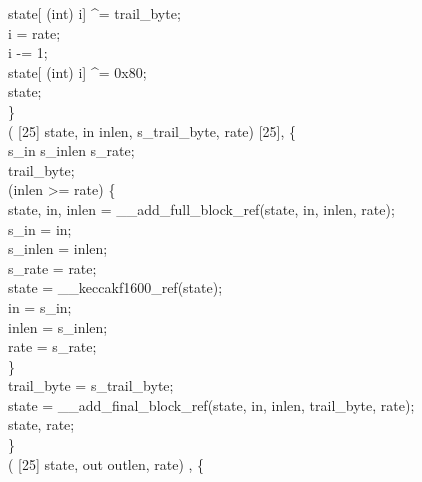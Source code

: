 state[ (int) i] \textasciicircum{}= trail_byte;\\
i = rate;\\
i -= 1;\\
state[ (int) i] \textasciicircum{}= 0x80;\\
 state;\\
\}\\
  ( [25] state,   in inlen,   s_trail_byte,   rate) \jasminarrow{}  [25],   \{\\
  s_in s_inlen s_rate;\\
  trail_byte;\\
  (inlen >= rate) \{\\
state, in, inlen = __add_full_block_ref(state, in, inlen, rate);\\
s_in = in;\\
s_inlen = inlen;\\
s_rate = rate;\\
state = __keccakf1600_ref(state);\\
in = s_in;\\
inlen = s_inlen;\\
rate = s_rate;\\
\}\\
trail_byte = s_trail_byte;\\
state = __add_final_block_ref(state, in, inlen, trail_byte, rate);\\
 state, rate;\\
\}\\
  ( [25] state,   out outlen,   rate) \jasminarrow{}  ,   \{\\
